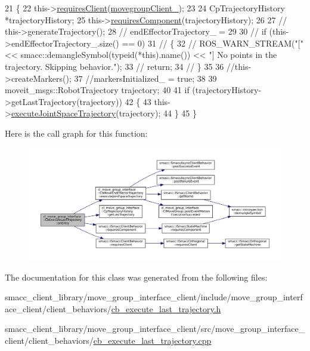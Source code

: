 \begin{DoxyCode}
21     \{
22         this->\hyperlink{classsmacc_1_1ISmaccClientBehavior_a32b16e99e3b4cb289414203dc861a440}{requiresClient}(\hyperlink{classcl__move__group__interface_1_1CbMoveEndEffectorTrajectory_aea650d3e7836125b32be97392b71a7f3}{movegroupClient\_});
23 
24         CpTrajectoryHistory *trajectoryHistory;
25         this->\hyperlink{classsmacc_1_1ISmaccClientBehavior_a19c6d658c8e809bb93bfdc9b639a3ac3}{requiresComponent}(trajectoryHistory);
26 
27         \textcolor{comment}{// this->generateTrajectory();}
28         \textcolor{comment}{// endEffectorTrajectory\_ =}
29 
30         \textcolor{comment}{// if (this->endEffectorTrajectory\_.size() == 0)}
31         \textcolor{comment}{// \{}
32         \textcolor{comment}{//     ROS\_WARN\_STREAM("[" << smacc::demangleSymbol(typeid(*this).name()) << "] No points in the
       trajectory. Skipping behavior.");}
33         \textcolor{comment}{//     return;}
34         \textcolor{comment}{// \}}
35 
36         \textcolor{comment}{//this->createMarkers();}
37         \textcolor{comment}{//markersInitialized\_ = true;}
38 
39         moveit\_msgs::RobotTrajectory trajectory;
40 
41         \textcolor{keywordflow}{if} (trajectoryHistory->getLastTrajectory(trajectory))
42         \{
43             this->\hyperlink{classcl__move__group__interface_1_1CbMoveEndEffectorTrajectory_a3a75fa185c62591e1869427650338a32}{executeJointSpaceTrajectory}(trajectory);
44         \}
45     \}
\end{DoxyCode}
Here is the call graph for this function\+:
\nopagebreak
\begin{figure}[H]
\begin{center}
\leavevmode
\includegraphics[width=350pt]{classcl__move__group__interface_1_1CbExecuteLastTrajectory_ac78713663c39635ca5ac9a749503e800_cgraph}
\end{center}
\end{figure}


The documentation for this class was generated from the following files\+:\begin{DoxyCompactItemize}
\item 
smacc\+\_\+client\+\_\+library/move\+\_\+group\+\_\+interface\+\_\+client/include/move\+\_\+group\+\_\+interface\+\_\+client/client\+\_\+behaviors/\hyperlink{cb__execute__last__trajectory_8h}{cb\+\_\+execute\+\_\+last\+\_\+trajectory.\+h}\item 
smacc\+\_\+client\+\_\+library/move\+\_\+group\+\_\+interface\+\_\+client/src/move\+\_\+group\+\_\+interface\+\_\+client/client\+\_\+behaviors/\hyperlink{cb__execute__last__trajectory_8cpp}{cb\+\_\+execute\+\_\+last\+\_\+trajectory.\+cpp}\end{DoxyCompactItemize}
